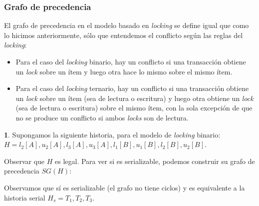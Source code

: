 \documentclass[english]{article}
\theoremstyle{definition}
\theoremstyle{definition}
\newtheorem{example}[thm]{\protect\examplename}
\providecommand{\examplename}{Ejemplo}
\begin{document}
\subsubsection{Grafo de precedencia}

El grafo de precedencia en el modelo basado en \emph{locking} se define igual
que como lo hicimos anteriormente, sólo que entendemos el conflicto según las
reglas del \emph{locking}:

\begin{itemize}
    \item Para el caso del \emph{locking} binario, hay un conflicto si una
        transacción obtiene un \emph{lock} sobre un ítem y luego otra hace lo
        mismo sobre el mismo ítem.
    \item Para el caso del \emph{locking} ternario, hay un conflicto si una
        transacción obtiene un \emph{lock} sobre un ítem (sea de lectura o
        escritura) y luego otra obtiene un \emph{lock} (sea de lectura o
        escritura) sobre el mismo ítem, con la sola excepción de que no se
        produce un conflicto si ambos \emph{locks} son de lectura.
\end{itemize}


\begin{example}
Supongamos la siguiente historia, para el modelo de \emph{locking} binario:
$H = l_2[A], u_2[A], l_3[A], u_3[A], l_1[B], u_1[B], l_2[B], u_2[B]$.

Observar que $H$ es legal. Para ver si es serializable, podemos construir su
grafo de precedencia $SG(H)$: 

\vspace{10pt}


Observamos que sí es serializable (el grafo no tiene ciclos) y es equivalente
a la historia serial $H_s = T_1, T_2, T_3$.
\end{example}
\end{document}
